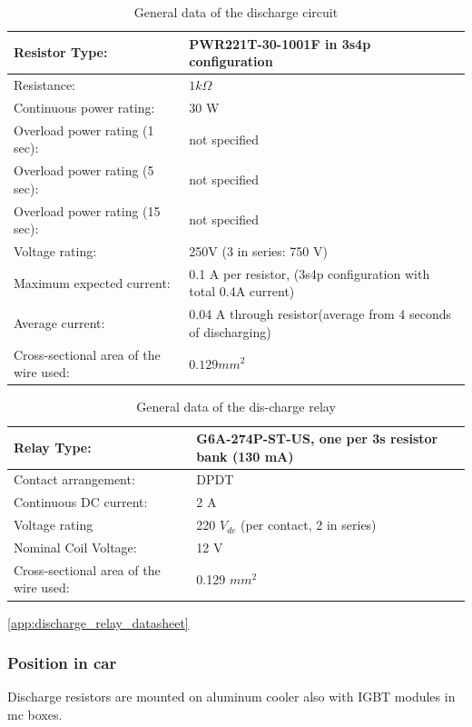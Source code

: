 \begin{table}[H]
	\centering
	\caption{General data of the discharge circuit}
	\begin{tabu}{|X|X|}
		\hline
		Resistor Type: & PWR221T-30-1001F in 3s4p configuration \\
		\hline
		Resistance: & $1 k\Omega$ \\
		\hline
		Continuous power rating: & 30 W \\
		\hline
		Overload power rating (1 sec): & not specified \\
		\hline
		Overload power rating (5 sec): & not specified \\
		\hline
		Overload power rating (15 sec): & not specified \\
		\hline
		Voltage rating: & 250V (3 in series: 750 V) \\
		\hline
		Maximum expected current: & 0.1 A per resistor, (3s4p configuration with total 0.4A current) \\
		\hline
		Average current: & 0.04 A through resistor(average from 4 seconds of discharging) \\
		\hline
		Cross-sectional area of the wire used: & $0.129 mm^2$ \\
		\hline
	\end{tabu}%
	\label{tab:dischrage-circ}%
\end{table}%

\begin{table}[H]
	\centering
	\caption{General data of the dis-charge relay}
	\begin{tabu}{|X|X|}
		\hline
		Relay Type: & G6A-274P-ST-US, one per 3s resistor bank (130 mA)\\
		\hline
		Contact arrangement: & DPDT \\
		\hline
		Continuous DC current: & 2 A \\
		\hline
		Voltage rating  & 220 $V_{dc}$ (per contact, 2 in series) \\
		\hline
		Nominal Coil Voltage:  & 12 V\\
		\hline
		Cross-sectional area of the wire used: & 0.129 $mm^2$ \\
		\hline
	\end{tabu}%
	\label{tab:discharge-relay}%
\end{table}%

\ref{app:discharge_relay_datasheet}


\subsubsection{Position in car}

Discharge resistors are mounted on aluminum cooler also with IGBT modules in \gls{mc} boxes.